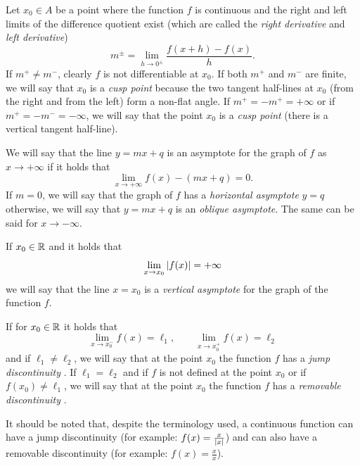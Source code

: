 \begin{definition}
Let $x_0\in A$ be a point where the function $f$ is continuous and the right and
left limits of the difference quotient exist (which are called the \emph{right
derivative} and \emph{left derivative})
\[
  m^{\pm} = \lim_{h\to 0^\pm}\frac{f(x+h) - f(x)}{h}.
\]
If $m^+ \neq m^-$, clearly $f$ is not differentiable at $x_0$.
If both $m^+$ and $m^-$ are finite, we will say that $x_0$ is a \emph{cusp
point}%
%
 because the two tangent half-lines at $x_0$ (from the right and from the left) form a non-flat angle.
If $m^+=-m^+=+\infty$ or if $m^+=-m^-=-\infty$, we will say that the point $x_0$
is a \emph{cusp point}%
%
 (there is a vertical tangent half-line).
\end{definition}

\begin{definition}[asymptotes]
We will say that the line $y=mx+q$ is an asymptote for the graph of $f$ as $x\to
+\infty$ if it holds that
\[
  \lim_{x\to +\infty} f(x) - (mx+q) = 0.
\]
If $m=0$, we will say that the graph of $f$ has a \emph{horizontal asymptote}
$y=q$
%
%
%
%
otherwise, we will say that $y=mx+q$ is an \emph{oblique asymptote}.
The same can be said for $x\to -\infty$.

If $x_0\in {\mathbb R}$ and it holds that 
\[
  \lim_{x\to x_0} {\left|f(x)\right|} = +\infty
\]
we will say that the line $x=x_0$ is a \emph{vertical asymptote}%
%
 for the graph of the function $f$.
\end{definition}

\begin{definition}
If for $x_0\in {\mathbb R}$ it holds that 
\[
  \lim_{x\to x_0^-} f(x) = \ell_1, 
  \qquad 
  \lim_{x\to x_0^+} f(x) = \ell_2
\]
and if $\ell_1\neq \ell_2$, we will say that at the point $x_0$ the function $f$
has a \emph{jump discontinuity}%
%
.
If $\ell_1=\ell_2$ and if $f$ is not defined at the point $x_0$ or if
$f(x_0)\neq \ell_1$, we will say that at the point $x_0$ the function $f$ has a
\emph{removable discontinuity}%
%
.
\end{definition}

It should be noted that, despite the terminology used, a continuous function can
have a jump discontinuity (for example: $f(x)=\frac{x}{{\left|x\right|}}$) and can also
have a removable discontinuity (for example: $f(x) = \frac{x}{x}$).